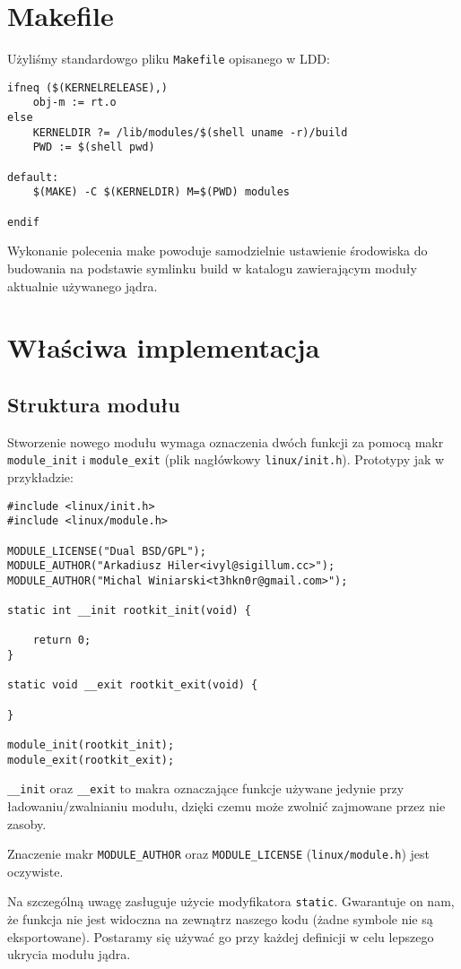 \documentclass[a4paper]{article}
\begin{document}
\section{Makefile}
Użyliśmy standardowgo pliku \texttt{Makefile} opisanego w LDD\cite{ldd3}:
\begin{verbatim}
ifneq ($(KERNELRELEASE),)
	obj-m := rt.o
else
	KERNELDIR ?= /lib/modules/$(shell uname -r)/build
	PWD := $(shell pwd)

default:
	$(MAKE) -C $(KERNELDIR) M=$(PWD) modules

endif
\end{verbatim}
Wykonanie polecenia make powoduje samodzielnie ustawienie środowiska do
budowania na podstawie symlinku build w katalogu zawierającym moduły aktualnie
używanego jądra.


\section{Właściwa implementacja}
\subsection{Struktura modułu}
Stworzenie nowego modułu wymaga oznaczenia dwóch funkcji za pomocą makr 
\texttt{module\_init} i \texttt{module\_exit} (plik nagłówkowy \texttt{linux/init.h}).
Prototypy jak w przykładzie:
\begin{verbatim}
#include <linux/init.h>
#include <linux/module.h>

MODULE_LICENSE("Dual BSD/GPL");
MODULE_AUTHOR("Arkadiusz Hiler<ivyl@sigillum.cc>");
MODULE_AUTHOR("Michal Winiarski<t3hkn0r@gmail.com>");

static int __init rootkit_init(void) {
	
	return 0;
}

static void __exit rootkit_exit(void) {

}

module_init(rootkit_init);
module_exit(rootkit_exit);
\end{verbatim}

\texttt{\_\_init} oraz \texttt{\_\_exit} to makra oznaczające funkcje
używane jedynie przy ładowaniu/zwalnianiu modułu, dzięki czemu może zwolnić
zajmowane przez nie zasoby.

Znaczenie makr \texttt{MODULE\_AUTHOR} oraz \texttt{MODULE\_LICENSE}
(\texttt{linux/module.h}) jest oczywiste.

Na szczególną uwagę zasługuje użycie modyfikatora \texttt{static}. Gwarantuje
on nam, że funkcja nie jest widoczna na zewnątrz naszego kodu (żadne symbole
nie są eksportowane). Postaramy się używać go przy każdej definicji w celu
lepszego ukrycia modułu jądra.
\end{document}
